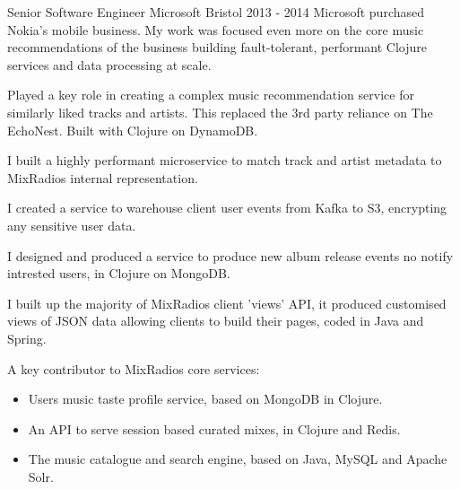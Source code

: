 \begin{cventries}
  \cventrypara
    {Senior Software Engineer} %
    {Microsoft} %
    {Bristol} %
    {2013  - 2014} %
    {Microsoft purchased Nokia's mobile business. My work was focused even more on the core music recommendations of the business building fault-tolerant, performant Clojure services and data processing at scale.}
    {
      \begin{cvitems} %
        \item {Played a key role in creating a complex music recommendation service for similarly liked tracks and artists. This replaced the 3rd party reliance on The EchoNest. Built with Clojure on DynamoDB.}
        \item {I built a highly performant microservice to match track and artist metadata to MixRadios internal representation.}
        \item {I created a service to warehouse client user events from Kafka to S3, encrypting any sensitive user data.}
        \item {I designed and produced a service to produce new album release events no notify intrested users, in Clojure on MongoDB.}
        \item {I built up the majority of MixRadios client ’views’ API, it produced customised views of JSON data allowing clients to build their pages, coded in Java and Spring.}
        \item {A key contributor to MixRadios core services:
            \begin{itemize}
                \item Users music taste profile service, based on MongoDB in Clojure.
                \item An API to serve session based curated mixes, in Clojure and Redis.
                \item The music catalogue and search engine, based on Java, MySQL and Apache Solr.
            \end{itemize}}
      \end{cvitems}
    }


\end{cventries}
